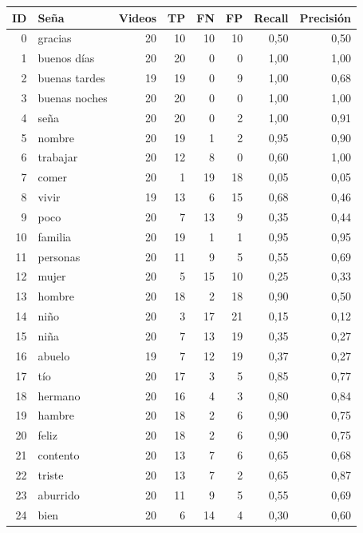 \begin{tabular}{@{}r l r r r r r r@{}}
\toprule
ID & Seña & Videos & TP & FN & FP & Recall & Precisión \\
\midrule
0 & gracias & 20 & 10 & 10 & 10 & 0,50 & 0,50 \\
\rowcolor{verde!15}1 & buenos días & 20 & 20 & 0 & 0 & 1,00 & 1,00 \\
\rowcolor{verde!15}2 & buenas tardes & 19 & 19 & 0 & 9 & 1,00 & 0,68 \\
\rowcolor{verde!15}3 & buenas noches & 20 & 20 & 0 & 0 & 1,00 & 1,00 \\
\rowcolor{verde!15}4 & seña & 20 & 20 & 0 & 2 & 1,00 & 0,91 \\
\rowcolor{verde!15}5 & nombre & 20 & 19 & 1 & 2 & 0,95 & 0,90 \\
6 & trabajar & 20 & 12 & 8 & 0 & 0,60 & 1,00 \\
\rowcolor{naranja!15}7 & comer & 20 & 1 & 19 & 18 & 0,05 & 0,05 \\
8 & vivir & 19 & 13 & 6 & 15 & 0,68 & 0,46 \\
9 & poco & 20 & 7 & 13 & 9 & 0,35 & 0,44 \\
\rowcolor{verde!15}10 & familia & 20 & 19 & 1 & 1 & 0,95 & 0,95 \\
11 & personas & 20 & 11 & 9 & 5 & 0,55 & 0,69 \\
\rowcolor{naranja!15}12 & mujer & 20 & 5 & 15 & 10 & 0,25 & 0,33 \\
\rowcolor{verde!15}13 & hombre & 20 & 18 & 2 & 18 & 0,90 & 0,50 \\
\rowcolor{naranja!15}14 & niño & 20 & 3 & 17 & 21 & 0,15 & 0,12 \\
15 & niña & 20 & 7 & 13 & 19 & 0,35 & 0,27 \\
16 & abuelo & 19 & 7 & 12 & 19 & 0,37 & 0,27 \\
\rowcolor{verde!15}17 & tío & 20 & 17 & 3 & 5 & 0,85 & 0,77 \\
\rowcolor{verde!15}18 & hermano & 20 & 16 & 4 & 3 & 0,80 & 0,84 \\
\rowcolor{verde!15}19 & hambre & 20 & 18 & 2 & 6 & 0,90 & 0,75 \\
\rowcolor{verde!15}20 & feliz & 20 & 18 & 2 & 6 & 0,90 & 0,75 \\
21 & contento & 20 & 13 & 7 & 6 & 0,65 & 0,68 \\
22 & triste & 20 & 13 & 7 & 2 & 0,65 & 0,87 \\
23 & aburrido & 20 & 11 & 9 & 5 & 0,55 & 0,69 \\
24 & bien & 20 & 6 & 14 & 4 & 0,30 & 0,60 \\
\bottomrule
\end{tabular}

